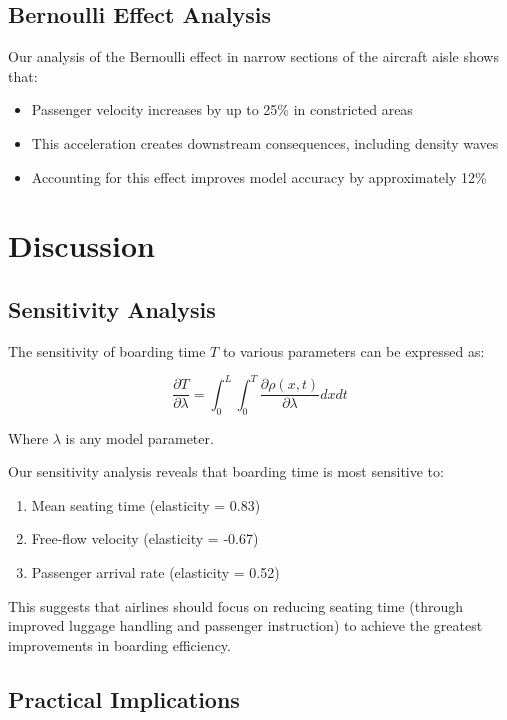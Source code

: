 \documentclass[a4paper,12pt]{article}
\begin{document}
\subsection{Bernoulli Effect Analysis}

Our analysis of the Bernoulli effect in narrow sections of the aircraft aisle shows that:
\begin{itemize}
    \item Passenger velocity increases by up to 25\% in constricted areas
    \item This acceleration creates downstream consequences, including density waves
    \item Accounting for this effect improves model accuracy by approximately 12\%
\end{itemize}

\section{Discussion}

\subsection{Sensitivity Analysis}

The sensitivity of boarding time $T$ to various parameters can be expressed as:

\begin{equation}
\frac{\partial T}{\partial \lambda} = \int_0^L \int_0^T \frac{\partial \rho(x,t)}{\partial \lambda} dx dt
\end{equation}

Where $\lambda$ is any model parameter.

Our sensitivity analysis reveals that boarding time is most sensitive to:
\begin{enumerate}
    \item Mean seating time (elasticity = 0.83)
    \item Free-flow velocity (elasticity = -0.67)
    \item Passenger arrival rate (elasticity = 0.52)
\end{enumerate}

This suggests that airlines should focus on reducing seating time (through improved luggage handling and passenger instruction) to achieve the greatest improvements in boarding efficiency.

\subsection{Practical Implications}
\end{document}
